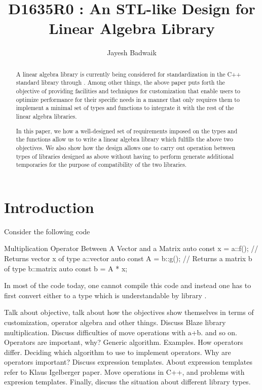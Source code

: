 \documentclass[oneside,11pt,a4paper]{jbarticle}
\subtitle{}
\title{D1635R0 : An STL-like Design for Linear Algebra Library}
\author{Jayesh Badwaik}
\begin{document}
\maketitle[\value{page}]
\begin{abstract}
  A linear algebra library is currently being considered for standardization in
  the C++ standard library through \cite{GuyDavidson2019}. Among other things,
  the above paper puts forth the objective of providing facilities and
  techniques for customization that enable users to optimize performance for
  their specific needs in a manner that only requires them to implement a
  minimal set of types and functions to integrate it with the rest of the linear
  algebra libraries.

  In this paper, we how a well-designed set of requirements imposed on
  the types and the functions allow us to write a linear algebra library which
  fulfills the above two objectives.  We also show how the design allows one
  to carry out operation between types of libraries designed as above without
  having to perform generate additional temporaries for the purpose of
  compatibility of the two libraries.
\end{abstract}

\section{Introduction}
Consider the following code
\begin{codecpp}{Multiplication Operator Between A Vector and a Matrix}
  auto const x = a::f(); // Returns vector x of type a::vector
  auto const A = b::g(); // Returns a matrix b of type b::matrix
  auto const b = A * x;
\end{codecpp}

In most of the code today, one cannot compile this code and instead one has to
first convert either  to a type which is understandable by library
.

Talk about objective, talk about how the objectives show themselves in terms of
customization, operator algebra and other things. Discuss Blaze library
multiplication. Discuss difficulties of move operations with a+b. and so on.
Operators are important, why? Generic algorithm. Examples. How operators
differ.  Deciding which algorithm to use to implement operators. Why are
operators important? Discuss expression templates.
About expression templates refer to Klaus Igelberger paper. Move operations in
C++, and problems with expresion templates. Finally, discuss the situation about
different library types.
\end{document}
